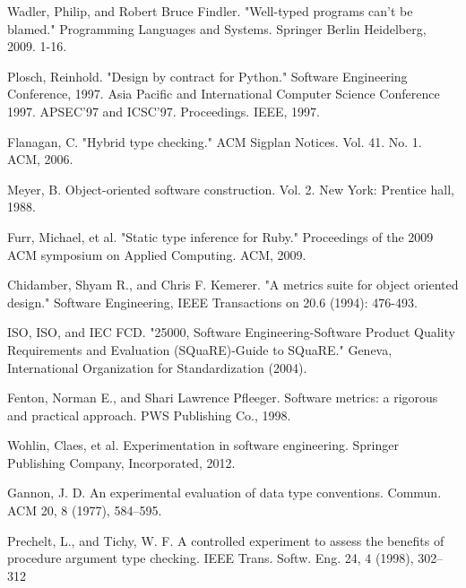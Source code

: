 \documentclass[]{sigplanconf}
\begin{document}
\begin{thebibliography}{}
Wadler, Philip, and Robert Bruce Findler. "Well-typed programs can’t be blamed." Programming Languages and Systems. Springer Berlin Heidelberg, 2009. 1-16.

Plosch, Reinhold. "Design by contract for Python." Software Engineering Conference, 1997. Asia Pacific and International Computer Science Conference 1997. APSEC'97 and ICSC'97. Proceedings. IEEE, 1997.

Flanagan, C. "Hybrid type checking." ACM Sigplan Notices. Vol. 41. No. 1. ACM, 2006.

Meyer, B. Object-oriented software construction. Vol. 2. New York: Prentice hall, 1988.

Furr, Michael, et al. "Static type inference for Ruby." Proceedings of the 2009 ACM symposium on Applied Computing. ACM, 2009.

Chidamber, Shyam R., and Chris F. Kemerer. "A metrics suite for object oriented design." Software Engineering, IEEE Transactions on 20.6 (1994): 476-493.

ISO, ISO, and IEC FCD. "25000, Software Engineering-Software Product Quality Requirements and Evaluation (SQuaRE)-Guide to SQuaRE." Geneva, International Organization for Standardization (2004).

Fenton, Norman E., and Shari Lawrence Pfleeger. Software metrics: a rigorous and practical approach. PWS Publishing Co., 1998.

Wohlin, Claes, et al. Experimentation in software engineering. Springer Publishing Company, Incorporated, 2012.

Gannon, J. D. An experimental evaluation of data type conventions. Commun. ACM 20, 8 (1977), 584–595.

Prechelt, L., and Tichy, W. F. A controlled experiment to assess the beneﬁts of procedure argument type checking. IEEE Trans. Softw. Eng. 24, 4 (1998), 302–312


\end{thebibliography}
\end{document}
